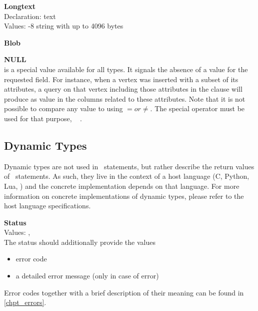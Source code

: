 \begin{minipage}{\textwidth}
\textbf{Longtext} \\
Declaration: text \\
Values: -8 string with up to 4096 bytes\\
\end{minipage}

\begin{minipage}{\textwidth}
\textbf{Blob} \\
\end{minipage}

\begin{minipage}{\textwidth}
\textbf{NULL} \\
 is a special value available for all types.
It signals the absence of a value for the requested field.
For instance, when a vertex was inserted with a subset
of its attributes, a query on that vertex including
those attributes in the  clause
will produce  as value in the
columns related to these attributes.
Note that it is not possible to compare any value to 
using $= or \neq$. The special operator  must
be used for that purpose, \eg\
  .
\end{minipage}

\subsection{Dynamic Types}
Dynamic types are not used in \sql\ statements,
but rather describe the return values of \sql\
statements. As such, they live in the context
of a host language (C, Python, Lua, \etc) and
the concrete implementation
depends on that language.
For more information on concrete implementations
of dynamic types, please refer to the
host language \acronym{api} specifications.

\begin{minipage}{\textwidth}
\textbf{Status}\\
Values: , \\
The status should additionally provide the values
\begin{itemize}
\item error code
\item a detailed error message (only in case of error)
\end{itemize}
Error codes together with a brief description
of their meaning can be found in \ref{chpt_errors}.
\end{minipage}

